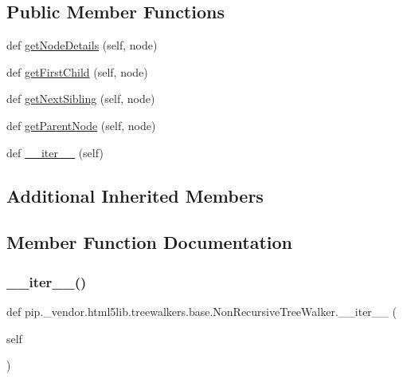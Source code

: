 \subsection*{Public Member Functions}
\begin{DoxyCompactItemize}
\item 
def \hyperlink{classpip_1_1__vendor_1_1html5lib_1_1treewalkers_1_1base_1_1NonRecursiveTreeWalker_af017320dfc23f4a534430ff83d966ca7}{get\+Node\+Details} (self, node)
\item 
def \hyperlink{classpip_1_1__vendor_1_1html5lib_1_1treewalkers_1_1base_1_1NonRecursiveTreeWalker_afc1cac32b8556af8b10045d9790558a7}{get\+First\+Child} (self, node)
\item 
def \hyperlink{classpip_1_1__vendor_1_1html5lib_1_1treewalkers_1_1base_1_1NonRecursiveTreeWalker_ad7ac7f993487a56b5c7ae146a28bf306}{get\+Next\+Sibling} (self, node)
\item 
def \hyperlink{classpip_1_1__vendor_1_1html5lib_1_1treewalkers_1_1base_1_1NonRecursiveTreeWalker_af1df748c2e1089b5bea6ed12cbc94afa}{get\+Parent\+Node} (self, node)
\item 
def \hyperlink{classpip_1_1__vendor_1_1html5lib_1_1treewalkers_1_1base_1_1NonRecursiveTreeWalker_a0ccaa634e5651e4ac1243dd234fe3766}{\+\_\+\+\_\+iter\+\_\+\+\_\+} (self)
\end{DoxyCompactItemize}
\subsection*{Additional Inherited Members}


\subsection{Member Function Documentation}
\mbox{\label{classpip_1_1__vendor_1_1html5lib_1_1treewalkers_1_1base_1_1NonRecursiveTreeWalker_a0ccaa634e5651e4ac1243dd234fe3766}} 
\subsubsection{\texorpdfstring{\+\_\+\+\_\+iter\+\_\+\+\_\+()}{\_\_iter\_\_()}}
{\footnotesize\ttfamily def pip.\+\_\+vendor.\+html5lib.\+treewalkers.\+base.\+Non\+Recursive\+Tree\+Walker.\+\_\+\+\_\+iter\+\_\+\+\_\+ (\begin{DoxyParamCaption}\item[{}]{self }\end{DoxyParamCaption})}

